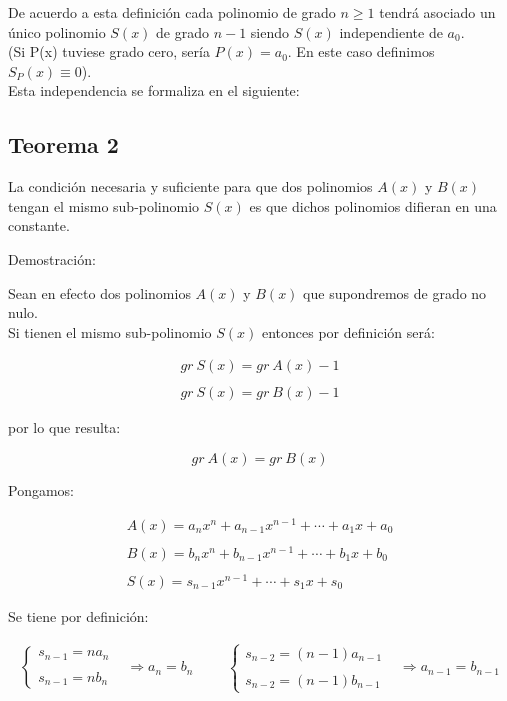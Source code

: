\documentclass[12pt]{article}
\begin{document}
De acuerdo a esta definición cada polinomio de grado $n\geqslant1$ tendrá asociado un único polinomio $S(x)$ de grado $n-1$ siendo $S(x)$ independiente de ${a}_0$. \\
(Si P(x) tuviese grado cero, sería $P(x)={a}_0$. En este caso definimos ${S}_P(x)\equiv0$).\\
Esta independencia se formaliza en el siguiente: \\

\subsection{Teorema 2}
La condición necesaria y suficiente para que dos polinomios $A(x)$ y $B(x)$ tengan el mismo sub-polinomio $S(x)$ es que dichos polinomios difieran en una constante.

Demostración:

Sean en efecto dos polinomios $A(x)$ y $B(x)$ que supondremos de grado no nulo. \\
Si tienen el mismo sub-polinomio $S(x)$ entonces por definición será:

$$
  \begin{array}{ccc}
    gr \ S(x)= gr \ A(x)-1 \\
    \\
    gr \ S(x)= gr \ B(x)-1
  \end{array}
$$

\begin{center}
  por lo que resulta:
\end{center}
$$
  gr \ A(x)=gr \ B(x)
$$

Pongamos:

$$
  \begin{array}{ccc}
    A(x)={a}_n x^n+{a}_{n-1} x^{n-1}+\cdots+{a}_1 x+{a}_0 \\
    \\
    B(x)={b}_n x^n+{b}_{n-1} x^{n-1}+\cdots+{b}_1 x+{b}_0 \\
    \\
    S(x)={s}_{n-1} x^{n-1}+\cdots+{s}_1 x+{s}_0
  \end{array}
$$

Se tiene por definición:

$$
  \begin{aligned}
    \left\{
    \begin{array}{ccc}
      {s}_{n-1}=n{a}_n \\
      \\
      {s}_{n-1}=n{b}_n
    \end{array}
    \right.
     &
    \Rightarrow {a}_n = {b}_n
     &   &  &
    \left\{
    \begin{array}{ccc}
      {s}_{n-2}=(n-1){a}_{n-1} \\
      \\
      {s}_{n-2}=(n-1){b}_{n-1}
    \end{array}
    \right.
     &
    \Rightarrow {a}_{n-1} = {b}_{n-1}
  \end{aligned}
$$
\end{document}
